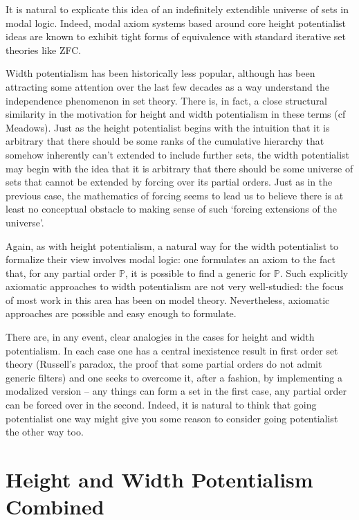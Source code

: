 \documentclass{article}
\begin{document}
It is natural to
explicate this idea of an indefinitely extendible 
universe of sets in modal logic. 
Indeed, modal axiom systems based around core height potentialist 
ideas are known to exhibit tight forms of 
equivalence with standard iterative set theories like ZFC.

Width potentialism has been historically 
less popular, although has been attracting 
some attention over the last few decades as a 
way understand the independence phenomenon in set 
theory. There is, in fact, a close structural 
similarity in the motivation for height  and 
width  potentialism in these terms (cf Meadows). 
Just as the height potentialist begins with the 
intuition that it is arbitrary that there should be 
some ranks of the cumulative hierarchy that somehow 
inherently can't extended to include further sets, 
the width  potentialist may begin with the idea that 
it is arbitrary that there should be some universe of 
sets that cannot be extended by forcing over its 
partial orders. Just as in the previous case, the 
mathematics of forcing seems to lead us to believe 
there is at least no conceptual obstacle to making 
sense of such `forcing extensions of the universe'.

Again, as with height potentialism, a natural way for the 
width  potentialist to formalize their view 
involves modal logic: one formulates an axiom to the 
fact that, for any partial order $\mathbb{P}$, it is possible to 
find a generic for $\mathbb{P}$. Such explicitly 
axiomatic approaches 
to width  potentialism are not very well-studied: 
the focus of most work in this area has been on model 
theory. Nevertheless, axiomatic approaches are possible 
and easy enough to formulate. 

There are, in any event, clear analogies 
in the cases for height  and width  potentialism. 
In each case one has a central inexistence result 
in first order set theory (Russell's paradox, the 
proof that some partial orders do not admit generic filters) 
and one seeks to overcome it, after a fashion, by 
implementing a modalized version -- any things can 
form a set in the first case, any partial order can 
be forced over in the second. Indeed, it is natural to think 
that going potentialist one way might give you some 
reason to consider going potentialist the other way too. 

\section{Height and Width Potentialism Combined}
\end{document}

